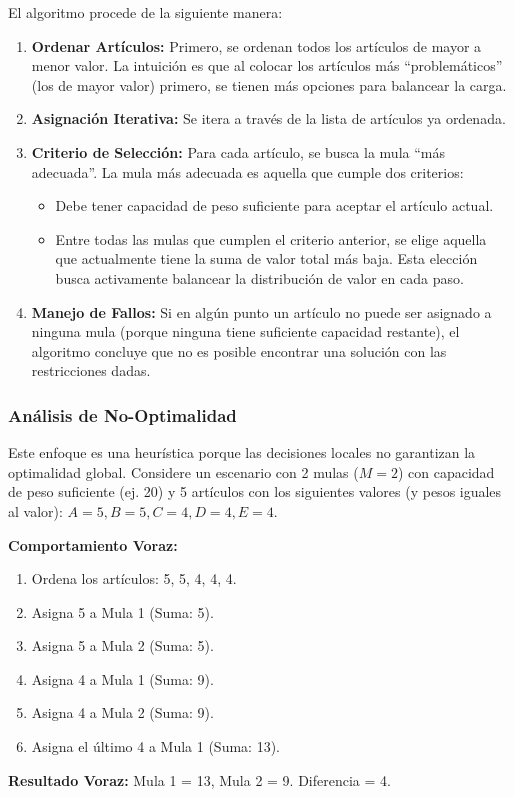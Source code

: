 \documentclass[12pt, a4paper]{article}
\begin{document}
    El algoritmo procede de la siguiente manera:
    \begin{enumerate}
        \item \textbf{Ordenar Artículos:} Primero, se ordenan todos los artículos de mayor a menor valor. La intuición es que al colocar los artículos más ``problemáticos'' (los de mayor valor) primero, se tienen más opciones para balancear la carga.
        \item \textbf{Asignación Iterativa:} Se itera a través de la lista de artículos ya ordenada.
        \item \textbf{Criterio de Selección:} Para cada artículo, se busca la mula ``más adecuada''. La mula más adecuada es aquella que cumple dos criterios:
        \begin{itemize}
            \item Debe tener capacidad de peso suficiente para aceptar el artículo actual.
            \item Entre todas las mulas que cumplen el criterio anterior, se elige aquella que actualmente tiene la suma de valor total más baja. Esta elección busca activamente balancear la distribución de valor en cada paso.
        \end{itemize}
        \item \textbf{Manejo de Fallos:} Si en algún punto un artículo no puede ser asignado a ninguna mula (porque ninguna tiene suficiente capacidad restante), el algoritmo concluye que no es posible encontrar una solución con las restricciones dadas.
    \end{enumerate}

    \subsubsection{Análisis de No-Optimalidad}
    Este enfoque es una heurística porque las decisiones locales no garantizan la optimalidad global. Considere un escenario con 2 mulas ($M=2$) con capacidad de peso suficiente (ej. 20) y 5 artículos con los siguientes valores (y pesos iguales al valor): $A=5, B=5, C=4, D=4, E=4$.

    \textbf{Comportamiento Voraz:}
    \begin{enumerate}
        \item Ordena los artículos: 5, 5, 4, 4, 4.
        \item Asigna 5 a Mula 1 (Suma: 5).
        \item Asigna 5 a Mula 2 (Suma: 5).
        \item Asigna 4 a Mula 1 (Suma: 9).
        \item Asigna 4 a Mula 2 (Suma: 9).
        \item Asigna el último 4 a Mula 1 (Suma: 13).
    \end{enumerate}
    \textbf{Resultado Voraz:} Mula 1 = 13, Mula 2 = 9. Diferencia = 4.
\end{document}
